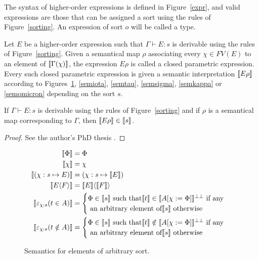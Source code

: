 \begin{definition}
  The syntax of higher-order expressions is defined in Figure~\ref{expr},
  and valid expressions are those that can be assigned a sort using the
  rules of Figure~\ref{sorting}. An expression of sort $o$ will be called
  a type.
\end{definition}

\begin{definition}
  Let $E$ be a higher-order expression such that $\Gamma \vdash E : s$ is
  derivable using the rules of Figure~\ref{sorting}. Given a semantical
  map $\rho$ associating every $\chi \in FV(E)$ to an element of
  $\llbracket \Gamma(\chi) \rrbracket$, the expression $E\rho$ is called
  a closed parametric expression. Every such closed parametric expression is
  given a semantic interpretation $\llbracket E\rho \rrbracket$ according to
  Figures~\ref{semany}, \ref{semiota}, \ref{semtau}, \ref{semsigma},
  \ref{semkappa} or \ref{semomicron} depending on the sort $s$.
\end{definition}

\begin{lemma}
  If $\Gamma \vdash E : s$ is derivable using the rules of
  Figure~\ref{sorting} and if $\rho$ is a semantical map corresponding to
  $\Gamma$, then $\llbracket E\rho \rrbracket \in \llbracket s \rrbracket$.
\end{lemma}
\begin{proof}
  See the author's PhD thesis \cite[Chapter~4]{Lepigre2017PhD}.
\end{proof}

\begin{figure}
  \begin{align*}
    \llbracket \Phi \rrbracket &= \Phi\\
    \llbracket \chi \rrbracket &= \chi\\
    \llbracket (\chi:s \mapsto E) \rrbracket
      &= (\chi:s \mapsto \llbracket E \rrbracket)\\
    \llbracket E\langle F \rangle \rrbracket
      &= \llbracket E \rrbracket \langle \llbracket F \rrbracket \rangle\\
    \llbracket \varepsilon_{\chi:s}(t \in A) \rrbracket
      &= \begin{cases}
           \Phi \in \llbracket s \rrbracket \text{ such that}
             \llbracket t \rrbracket \in \llbracket A[\chi := \Phi]
             \rrbracket^{\bot\bot} \text{ if any}\\
           \text{ an arbitrary element of} \llbracket s \rrbracket
             \text { otherwise}
         \end{cases}\\
    \llbracket \varepsilon_{\chi:s}(t \notin A) \rrbracket
      &= \begin{cases}
           \Phi \in \llbracket s \rrbracket \text{ such that}
             \llbracket t \rrbracket \notin \llbracket A[\chi := \Phi]
             \rrbracket^{\bot\bot} \text{ if any}\\
           \text{ an arbitrary element of} \llbracket s \rrbracket
             \text { otherwise}
         \end{cases}
  \end{align*}
  \caption{Semantics for elements of arbitrary sort.}\label{semany}
\end{figure}

